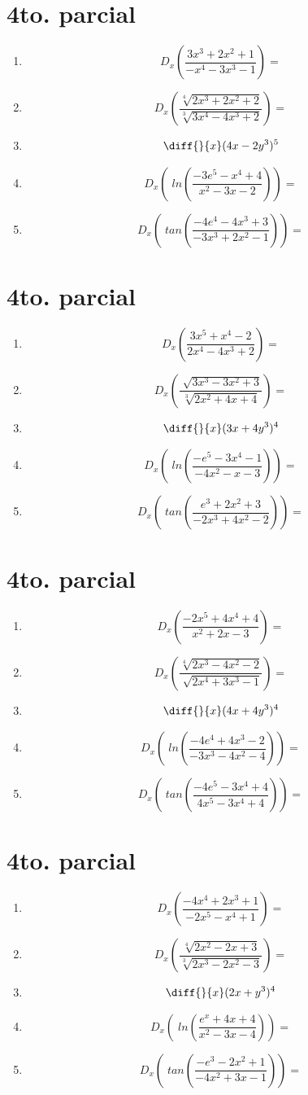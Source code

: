 \documentclass[oneside,spanish,letter]{article}
\begin{document}
\section{4to. parcial}
\begin{enumerate}
 \item $$ D_x \left( \frac{3x^3+2x^2+1}{-x^4-3x^3-1}\right)=$$
 \item $$ D_x \left( \frac{\sqrt[4]{2x^3+2x^2+2}}{\sqrt[3]{3x^4-4x^3+2}}\right)=$$
\item $$\diff{}{x}(4x-2y^3)^5$$
 \item $$ D_x \left(\;ln\left( \frac{-3e^5-x^4+4}{x^2-3x-2}\right)\right)=$$
 \item $$ D_x \left(\;tan\left( \frac{-4e^4-4x^3+3}{-3x^3+2x^2-1}\right)\right)=$$
 \end{enumerate}
  \newpage
\section{4to. parcial}
\begin{enumerate}
 \item $$ D_x \left( \frac{3x^5+x^4-2}{2x^4-4x^3+2}\right)=$$
 \item $$ D_x \left( \frac{\sqrt[]{3x^3-3x^2+3}}{\sqrt[3]{2x^2+4x+4}}\right)=$$
\item $$\diff{}{x}(3x+4y^3)^4$$
 \item $$ D_x \left(\;ln\left( \frac{-e^5-3x^4-1}{-4x^2-x-3}\right)\right)=$$
 \item $$ D_x \left(\;tan\left( \frac{e^3+2x^2+3}{-2x^3+4x^2-2}\right)\right)=$$
 \end{enumerate}
  \newpage
\section{4to. parcial}
\begin{enumerate}
 \item $$ D_x \left( \frac{-2x^5+4x^4+4}{x^2+2x-3}\right)=$$
 \item $$ D_x \left( \frac{\sqrt[4]{2x^3-4x^2-2}}{\sqrt[]{2x^4+3x^3-1}}\right)=$$
\item $$\diff{}{x}(4x+4y^3)^4$$
 \item $$ D_x \left(\;ln\left( \frac{-4e^4+4x^3-2}{-3x^3-4x^2-4}\right)\right)=$$
 \item $$ D_x \left(\;tan\left( \frac{-4e^5-3x^4+4}{4x^5-3x^4+4}\right)\right)=$$
 \end{enumerate}
  \newpage
\section{4to. parcial}
\begin{enumerate}
 \item $$ D_x \left( \frac{-4x^4+2x^3+1}{-2x^5-x^4+1}\right)=$$
 \item $$ D_x \left( \frac{\sqrt[4]{2x^2-2x+3}}{\sqrt[3]{2x^3-2x^2-3}}\right)=$$
\item $$\diff{}{x}(2x+y^3)^4$$
 \item $$ D_x \left(\;ln\left( \frac{e^x+4x+4}{x^2-3x-4}\right)\right)=$$
 \item $$ D_x \left(\;tan\left( \frac{-e^3-2x^2+1}{-4x^2+3x-1}\right)\right)=$$
 \end{enumerate}
  \newpage
\end{document}
